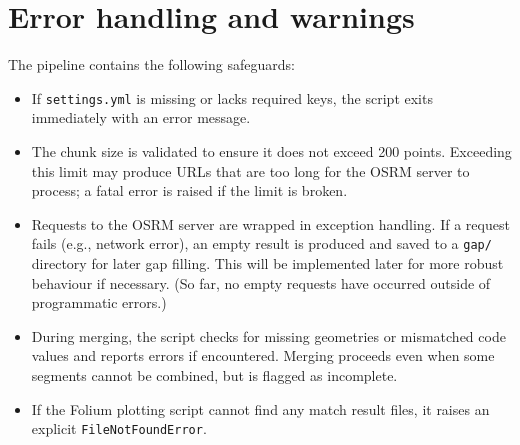 \documentclass[11pt,a4paper]{article}
\begin{document}
\section{Error handling and warnings}
The pipeline contains the following safeguards:
\begin{itemize}
	\item If \texttt{settings.yml} is missing or lacks required keys, the script exits immediately with an error message.
	\item The chunk size is validated to ensure it does not exceed 200 points. Exceeding this limit may produce URLs that are too long for the OSRM server to process; a fatal error is raised if the limit is broken.
	\item Requests to the OSRM server are wrapped in exception handling.  If a request fails (e.g., network error), an empty result is produced and saved to a \texttt{gap/} directory for later gap filling. This will be implemented later for more robust behaviour if necessary. (So far, no empty requests have occurred outside of programmatic errors.)
	\item During merging, the script checks for missing geometries or mismatched code values and reports errors if encountered.  Merging proceeds even when some segments cannot be combined, but is flagged as incomplete.
	\item If the Folium plotting script cannot find any match result files, it raises an explicit \texttt{FileNotFoundError}.
\end{itemize}



\end{document}
